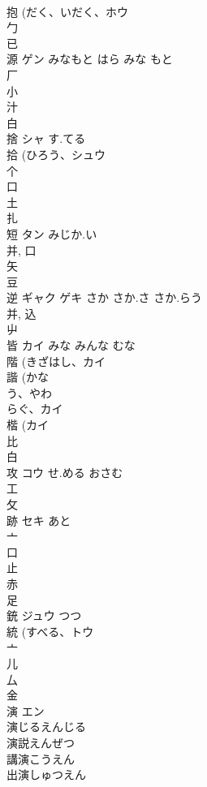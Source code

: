 \documentclass[8pt]{extreport}
\begin{document}
\begin{CJK}{UTF8}{min}
\\	抱 (だく、いだく、ホウ 
\\	勹 
\\	已 
\\	源	ゲン	みなもと はら みな もと	
\\	厂 
\\	小 
\\	汁 
\\	白 
\\	捨	シャ	す.てる	
\\	拾 (ひろう、シュウ 
\\	个 
\\	口 
\\	土 
\\	扎	
\\	短	タン	みじか.い	
\\	并, 口 
\\	矢 
\\	豆 
\\	逆	ギャク ゲキ	さか さか.さ さか.らう	
\\	并, 込 
\\	屮 
\\	皆	カイ	みな みんな むな	
\\	階 (きざはし、カイ 
\\	諧 (かな
\\	う、やわ
\\	らぐ、カイ 
\\	楷 (カイ 
\\	比 
\\	白 
\\	攻	コウ	せ.める おさむ	
\\	工 
\\	攵 
\\	跡	セキ	あと	
\\	亠 
\\	口 
\\	止 
\\	赤 
\\	足 
\\	銃	ジュウ	つつ	
\\	統 (すべる、トウ 
\\	亠 
\\	儿 
\\	厶 
\\	金 
\\	演	エン		
\\	演じるえんじる
\\	演説えんぜつ
\\	講演こうえん
\\	出演しゅつえん

\end{CJK}
\end{document}

